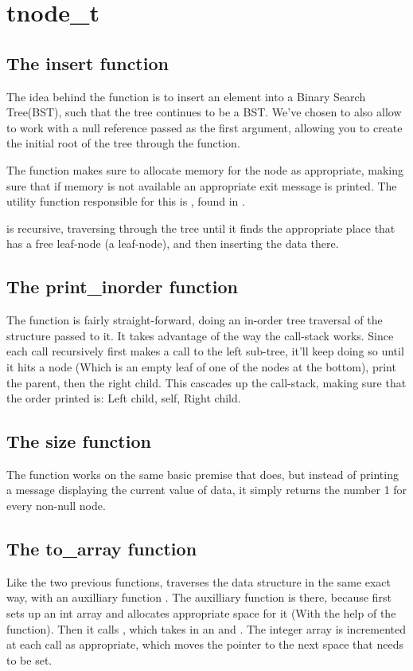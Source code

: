 \section{tnode\_t}
\subsection{The insert function}
The idea behind the  function is to insert an element into
a Binary Search Tree(BST), such that the tree continues to be a BST. We've
chosen to also allow  to work with a null reference passed as
the first argument, allowing you to create the initial root of the tree through
the function.

The function makes sure to allocate memory for the node as appropriate, making
sure that if memory is not available an appropriate exit message is printed. The
utility function responsible for this is , 
found in .

 is recursive, traversing through the tree until it finds the
appropriate place that has a free leaf-node (a  leaf-node), and
then inserting the data there.

\subsection{The print\_inorder function}
The  function is fairly straight-forward, doing an
in-order tree traversal of the  structure passed to it. It
takes advantage of the way the call-stack works. Since each call recursively
first makes a call to the left sub-tree, it'll keep doing so until it hits a
 node (Which is an empty leaf of one of the nodes at the bottom),
print the parent, then the right child. This cascades up the call-stack, making
sure that the order printed is: Left child, self, Right child.

\subsection{The size function}
The  function works on the same basic premise
that  does, but instead of printing a message
displaying the current value of data, it simply returns the number 1 for
every non-null node.

\subsection{The to\_array function}
Like the two previous functions,  traverses the data structure
in the same exact way, with an auxilliary function . The
auxilliary function is there, because  first sets up an int array
and allocates appropriate space for it (With the help of the  function).
Then it calls , which takes in an  and
. The integer array is incremented at each call as appropriate, which
moves the pointer to the next space that needs to be set.
